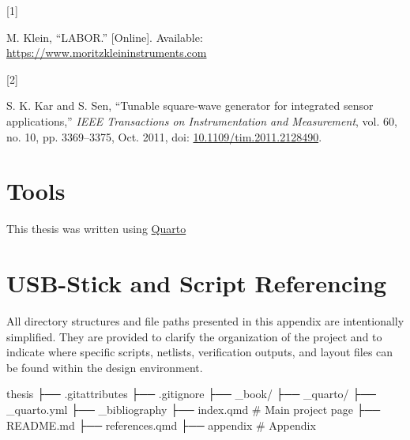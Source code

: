 \documentclass[
  11pt,
  a4paper,
  twoside]{scrbook}
\newenvironment{Shaded}{}{}
\newcommand{\NormalTok}[1]{#1}
\newlength{\cslhangindent}
\newlength{\csllabelwidth}
\newenvironment{CSLReferences}[2] %
 {\begin{list}{}{%
  \setlength{\itemindent}{0pt}
  \setlength{\leftmargin}{0pt}
  \setlength{\parsep}{0pt}
  \ifodd #1
   \setlength{\leftmargin}{\cslhangindent}
   \setlength{\itemindent}{-1\cslhangindent}
  \fi
  \setlength{\itemsep}{#2\baselineskip}}}
 {\end{list}}
\newcommand{\CSLLeftMargin}[1]{\parbox[t]{\csllabelwidth}{\strut#1\strut}}
\newcommand{\CSLRightInline}[1]{\parbox[t]{\linewidth - \csllabelwidth}{\strut#1\strut}}
\begin{document}

\protect{}\label{refs}
\begin{CSLReferences}{0}{0}
\CSLLeftMargin{{[}1{]} }%
\CSLRightInline{M. Klein, {``LABOR.''} {[}Online{]}. Available:
\url{https://www.moritzkleininstruments.com}}

\CSLLeftMargin{{[}2{]} }%
\CSLRightInline{S. K. Kar and S. Sen, {``Tunable square-wave generator
for integrated sensor applications,''} \emph{IEEE Transactions on
Instrumentation and Measurement}, vol. 60, no. 10, pp. 3369--3375, Oct.
2011, doi:
\href{https://doi.org/10.1109/tim.2011.2128490}{10.1109/tim.2011.2128490}.}

\end{CSLReferences}

\cleardoublepage
{}
{}
\appendix

\chapter{Tools}\label{sec-tools}

This thesis was written using \href{https://quarto.org/}{Quarto}

\chapter{USB-Stick and Script
Referencing}\label{usb-stick-and-script-referencing}

All directory structures and file paths presented in this appendix are
intentionally simplified. They are provided to clarify the organization
of the project and to indicate where specific scripts, netlists,
verification outputs, and layout files can be found within the design
environment.

\begin{Shaded}
\begin{Highlighting}[]
\NormalTok{thesis}
\NormalTok{├── .gitattributes}
\NormalTok{├── .gitignore}
\NormalTok{├── \_book/}
\NormalTok{├── \_quarto/}
\NormalTok{├── \_quarto.yml}
\NormalTok{├── \_bibliography}
\NormalTok{├── index.qmd            \# Main project page}
\NormalTok{├── README.md}
\NormalTok{├── references.qmd}
\NormalTok{├── appendix             \# Appendix}
\end{Highlighting}
\end{Shaded}



\backmatter
\end{document}
